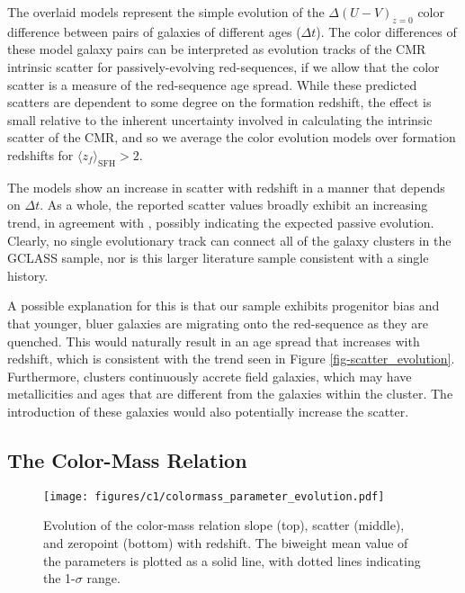 The overlaid models represent the simple evolution of the $\Delta (U-V)_{z=0}$ color difference between pairs of galaxies of different ages ($\Delta t$). The color differences of these model galaxy pairs can be interpreted as evolution tracks of the CMR intrinsic scatter for passively-evolving red-sequences, if we allow that the color scatter is a measure of the red-sequence age spread. While these predicted scatters are dependent to some degree on the formation redshift, the effect is small relative to the inherent uncertainty involved in calculating the intrinsic scatter of the CMR, and so we average the color evolution models over formation redshifts for $\langle z_f \rangle_\mathrm{SFH} > 2$.

The models show an increase in scatter with redshift in a manner that depends on $\Delta t$. As a whole, the reported scatter values broadly exhibit an increasing trend, in agreement with \citet{Hilton:2009nq}, possibly indicating the expected passive evolution. Clearly, no single evolutionary track can connect all of the galaxy clusters in the GCLASS sample, nor is this larger literature sample consistent with a single history. %

A possible explanation for this is that our sample exhibits progenitor bias \citep{2000ApJ...541...95V,2001ASPC..230..581F} and that younger, bluer galaxies are migrating onto the red-sequence as they are quenched. This would naturally result in an age spread that increases with redshift, which is consistent with the trend seen in Figure \ref{fig-scatter_evolution}. Furthermore, clusters continuously accrete field galaxies, which may have metallicities and ages that are different from the galaxies within the cluster. The introduction of these galaxies would also potentially increase the scatter.

\subsection{The Color-Mass Relation}\label{sec-colormass}

\begin{figure}[t]
\texttt{[image: figures/c1/colormass\_parameter\_evolution.pdf]}
\caption[Evolution of the color-mass relation slope, scatter, and zeropoint with redshift]{Evolution of the color-mass relation slope (top), scatter (middle), and zeropoint (bottom) with redshift. The biweight mean value of the parameters is plotted as a solid line, with dotted lines indicating the 1-$\sigma$ range.\label{fig-massparams}}
\end{figure}

